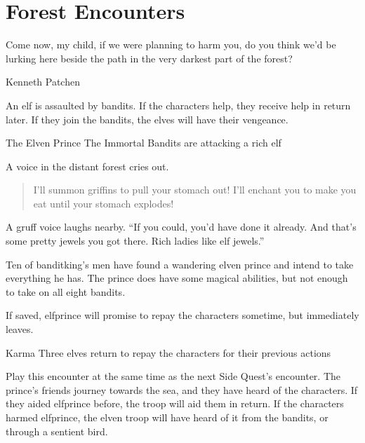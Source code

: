 \section{Forest Encounters}

\epigraph{Come now, my child, if we were planning to harm you, do you think we'd be lurking here beside the path in the very darkest part of the forest?}{Kenneth Patchen}

\renewcommand{\sqarea}{Forest}

\setcounter{enc}{0}

\begin{multicols}{2}

\label{littleprince}

\startcontents[sq]

\sqminitoc

\noindent
An elf is assaulted by bandits.
If the characters help, they receive help in return later.
If they join the bandits, the elves will have their vengeance.

{The Elven Prince}%
{The Immortal Bandits are attacking a rich elf}%

\begin{boxtext}
	A voice in the distant forest cries out.
	\begin{quote}
		I'll summon griffins to pull your stomach out!  I'll enchant you to make you eat until your stomach explodes!
	\end{quote}

	A gruff voice laughs nearby.  ``If you could, you'd have done it already.  And that's some pretty jewels you got there.  Rich ladies like elf jewels.''

\end{boxtext}

Ten of \gls{banditking}'s men have found a wandering elven prince and intend to take everything he has.
The prince does have some magical abilities, but not enough to take on all eight bandits.


\elfprince

If saved, \gls{elfprince} will promise to repay the characters sometime, but immediately leaves.

{Karma}%
{Three elves return to repay the characters for their previous actions}%

Play this encounter at the same time as the next Side Quest's encounter.
The prince's friends journey towards the sea, and they have heard of the characters.
If they aided \gls{elfprince} before, the troop will aid them in return.
If the characters harmed \gls{elfprince}, the elven troop will have heard of it from the bandits, or through a sentient bird.


\end{multicols}

